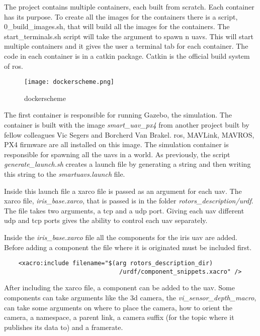
The project contains multiple containers, each built from scratch. Each container has its purpose. 
To create all the images for the containers there is a script, 0\_build\_images.sh, that will build 
all the images for the containers. 
The start\_terminals.sh script will take the argument to spawn n \acp{uav}. 
This will start multiple containers and it gives the user a terminal tab for each container. 
The code in each container is in a catkin package. Catkin is the official build system of \acs{ros}. 

\begin{figure}[ht]
    \centering
    \texttt{[image: dockerscheme.png]}
    \caption[dockerscheme]{dockerscheme}
\end{figure}

The first container is responsible for running Gazebo, the simulation. 
The container is built with the image \textit{smart\_uav\_px4} 
from another project built by fellow colleagues Vic Segers and Borcherd Van Brakel. \acs{ros}, MAVLink, 
MAVROS, PX4 firmware are all installed on this image. 
The simulation container is responsible for spawning all the \acp{uav} in a world. As previously, 
the script \textit{generate\_launch.sh} creates a launch file 
by generating a string and then writing this string to the \textit{smartuavs.launch} file. 

\newpage
Inside this launch file a xarco file is passed as an argument for each \acs{uav}. 
The xarco file, \textit{iris\_base.xarco}, that is passed is in the folder \textit{rotors\_description/urdf}. 
The file takes two arguments, a \acs{tcp} and a \acs{udp} port. Giving each \acs{uav} different \acs{udp} and 
\acs{tcp} ports gives the ability to control each \acs{uav} separately. 

Inside the \textit{iris\_base.xarco} file all the components for the iris \acs{uav} are added. 
Before adding a component the file where it is originated must be included first. 


\begin{verbatim}
    <xacro:include filename="$(arg rotors_description_dir)
                                /urdf/component_snippets.xacro" />

\end{verbatim}

After including the xarco file, a component can be added to the \acs{uav}. 
Some components can take arguments like the \acs{3d} camera, the \textit{vi\_sensor\_depth\_macro}, 
can take some arguments on where to place the camera, how to orient the camera, 
a namespace, a parent link, a camera suffix (for the topic where it publishes its data to) and a framerate. 

